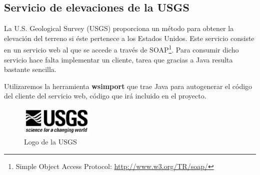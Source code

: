\subsection{Servicio de elevaciones de la USGS}

La U.S. Geological Survey (USGS) proporciona un método para obtener la elevación
del terreno si éste pertenece a los Estados Unidos. Este servicio consiste en un
servicio web al que se accede a través de SOAP\footnote{Simple Object Access
Protocol: \url{http://www.w3.org/TR/soap/}}. Para consumir dicho servicio hace
falta implementar un cliente, tarea que gracias a Java resulta bastante
sencilla.

Utilizaremos la herramienta {\bf wsimport} que trae Java para autogenerar el
código del cliente del servicio web, código que irá incluido en el proyecto.

\begin{figure}[H]
 \centering
 \includegraphics[width=35mm]{figuras/cap4/usgs.png}
 \caption{Logo de la USGS}
\end{figure}

